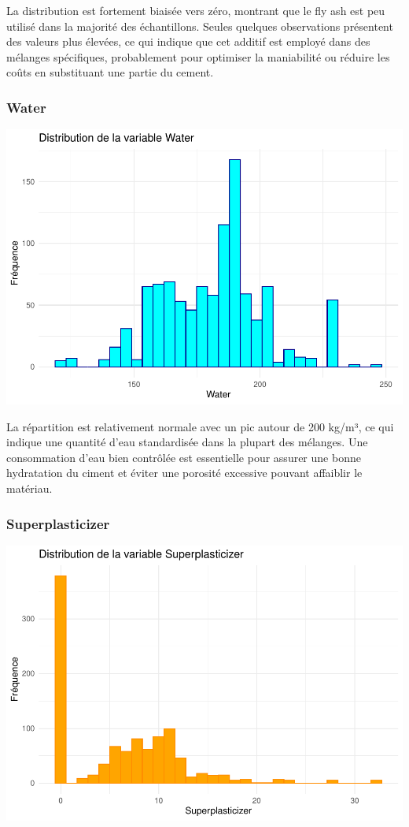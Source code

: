 \documentclass[
  12pt,
]{article}
\begin{document}
La distribution est fortement biaisée vers zéro, montrant que le fly ash
est peu utilisé dans la majorité des échantillons. Seules quelques
observations présentent des valeurs plus élevées, ce qui indique que cet
additif est employé dans des mélanges spécifiques, probablement pour
optimiser la maniabilité ou réduire les coûts en substituant une partie
du cement.

\subsubsection{Water}\label{water}

\includegraphics{rmd_final_files/figure-latex/unnamed-chunk-4-1.pdf}

La répartition est relativement normale avec un pic autour de 200 kg/m³,
ce qui indique une quantité d'eau standardisée dans la plupart des
mélanges. Une consommation d'eau bien contrôlée est essentielle pour
assurer une bonne hydratation du ciment et éviter une porosité excessive
pouvant affaiblir le matériau.

\subsubsection{Superplasticizer}\label{superplasticizer}

\includegraphics{rmd_final_files/figure-latex/unnamed-chunk-5-1.pdf}
\end{document}
